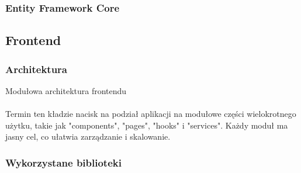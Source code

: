 \documentclass[12pt,a4paper]{article}
\begin{document}
\newpage

        \subsubsection{Entity Framework Core}


    \subsection{Frontend}
        \subsubsection{Architektura}
Modułowa architektura frontendu
\\\\
Termin ten kładzie nacisk na podział aplikacji na modułowe części wielokrotnego użytku, takie jak "components", "pages", "hooks" i "services". Każdy moduł ma jasny cel, co ułatwia zarządzanie i skalowanie.


\subsubsection{Wykorzystane biblioteki}
\end{document}
